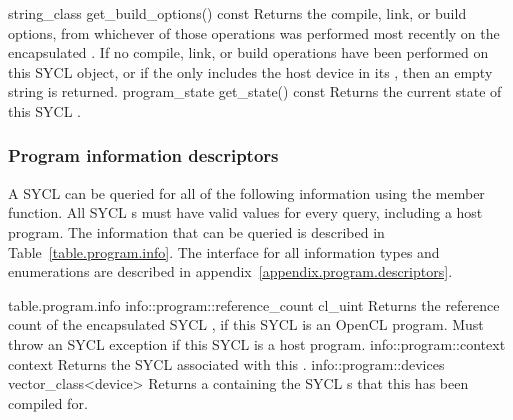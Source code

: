   \addRow
    {string_class get_build_options() const}
    {
       Returns the compile, link, or build options, from whichever of those operations was performed most recently on the encapsulated .  If no compile, link, or build operations have been performed on this SYCL  object, or if the  only includes the host device in its , then an empty string is returned.
    }
  \addRow
    {program_state get_state() const}
    {
       Returns the current state of this SYCL .
    }
\completeTable

\subsubsection{Program information descriptors}

A SYCL  can be queried for all of the following information using the  member function. All SYCL s must have valid values for every query, including a host program. The information that can be queried is described in Table~\ref{table.program.info}. The interface for all information types and enumerations are described in appendix~\ref{appendix.program.descriptors}.

{table.program.info}
\addInfoRow
    {info::program::reference_count}
    {cl_uint}
    {
      Returns the reference count of the encapsulated SYCL ,
  if this SYCL  is an OpenCL program. Must throw an  SYCL exception if this SYCL  is a host program.
    }
\addInfoRow
    {info::program::context}
    {context}
    {
      Returns the SYCL  associated with this .
    }
  \addInfoRow
    {info::program::devices}
    {vector_class<device>}
    {
      Returns a  containing the SYCL s that this  has been compiled for.
    }
\completeInfoTable


